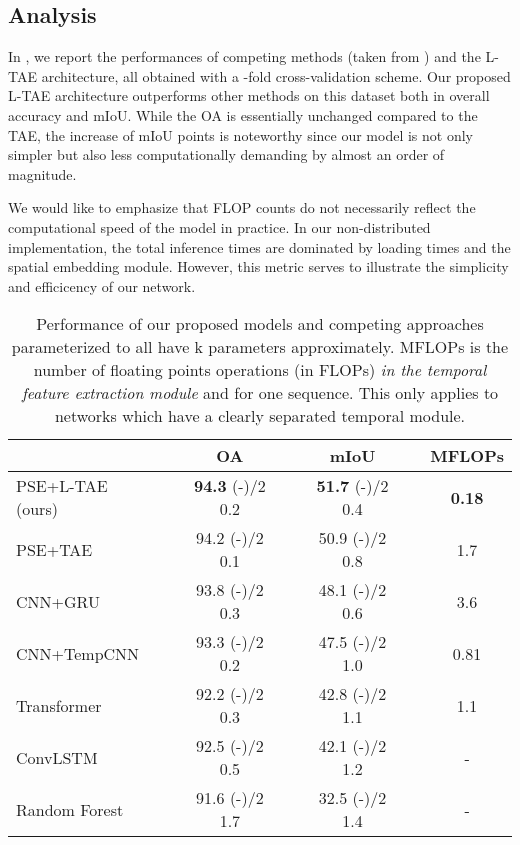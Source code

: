 \documentclass[runningheads]{llncs}
\newcommand{\rpm}{\sbox0{}\sbox2{}
 \raise\dimexpr(\ht0-\ht2)/2\relax\box2 }
\begin{document}
\subsection{Analysis}
In , we report the performances of competing methods (taken from \cite{garnot2019satellite}) and the L-TAE architecture, all obtained with a -fold cross-validation scheme.
Our proposed L-TAE architecture outperforms other methods on this dataset both in overall accuracy and mIoU. 
While the OA is essentially unchanged compared to the TAE, the increase of  mIoU points is noteworthy since our model is not only simpler but also less computationally demanding by almost an order of magnitude.

We would like to emphasize that FLOP counts do not necessarily reflect the computational speed  of the model in practice. In our non-distributed implementation, the total inference times are dominated by loading times and the spatial embedding module. However, this metric serves to illustrate the simplicity and efficicency of our network.
\begin{table}[h!]
\caption{Performance of our proposed models and competing approaches parameterized to all have k parameters approximately. MFLOPs is the number of floating points operations (in FLOPs) \emph{in the temporal feature extraction module} and for one sequence. This only applies to networks which have a clearly separated temporal module.}
\begin{center}
\begin{tabular}{lcccccc}
 &\phantom{abc}& OA   &\phantom{abc}&mIoU & \phantom{abc} &MFLOPs   \\\toprule
PSE+L-TAE (ours) && \textbf{94.3}  \footnotesize{\rpm 0.2}  & &\textbf{51.7} \footnotesize{\rpm 0.4} && \bf 0.18\\
PSE+TAE \cite{garnot2019satellite}                   & &94.2 \footnotesize{\rpm 0.1}  &&  50.9  \footnotesize{\rpm 0.8}    && 1.7 \\ CNN+GRU  \cite{garnot2019time}                  && 93.8 \footnotesize{\rpm 0.3}    &&   48.1  \footnotesize{\rpm 0.6} && 3.6   \\CNN+TempCNN \cite{pelletier2019temporal}        && 93.3\footnotesize{\rpm 0.2}    &&   47.5\footnotesize{\rpm 1.0} && 0.81\\ Transformer \cite{russwurm2019self}                    &&  92.2 \footnotesize{\rpm 0.3 }  &&  42.8  \footnotesize{\rpm  1.1} && 1.1\\
ConvLSTM  \cite{russwurm2018convolutional}     & & 92.5\footnotesize{\rpm 0.5}    &&   42.1\footnotesize{\rpm 1.2} && - \\Random Forest \cite{bailly2018crop}        && 91.6\footnotesize{\rpm 1.7}   && 32.5  \footnotesize{\rpm 1.4} && - \\\bottomrule
\end{tabular}
\end{center}
\vspace{-.39cm}
\label{tab:perf_classif}
\centering
\end{table}
\end{document}
